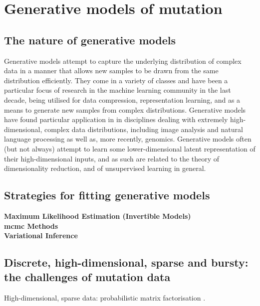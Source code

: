 \documentclass[../thesis.tex]{subfiles}
\begin{document}
\section{Generative models of mutation}

\subsection{The nature of generative models}
Generative models attempt to capture the underlying distribution of complex data in a manner that allows new samples to be drawn from the same distribution efficiently. They come in a variety of classes and have been a particular focus of research in the machine learning community in the last decade, being utilised for data compression, representation learning, and as a means to generate new samples from complex distributions. Generative models have found particular application in  in disciplines dealing with extremely high-dimensional, complex data distributions, including image analysis and natural language processing as well as, more recently, genomics. Generative models often (but not always) attempt to learn some lower-dimensional latent representation of their high-dimensional inputs, and as such are related to the theory of dimensionality reduction, and of unsupervised learning in general. 



\subsection{Strategies for fitting generative models}
\textbf{Maximum Likelihood Estimation (Invertible Models)} \\
\textbf{\gls{mcmc} Methods} \\
\textbf{Variational Inference} \\
\citep{blei_variational_2017}


\subsection{Discrete, high-dimensional, sparse and bursty: the challenges of mutation data}
High-dimensional, sparse data: probabilistic matrix factorisation \citep{salakhutdinov_probabilistic_2007}. \\

\citep{zhao_variational_2020}
\end{document}
